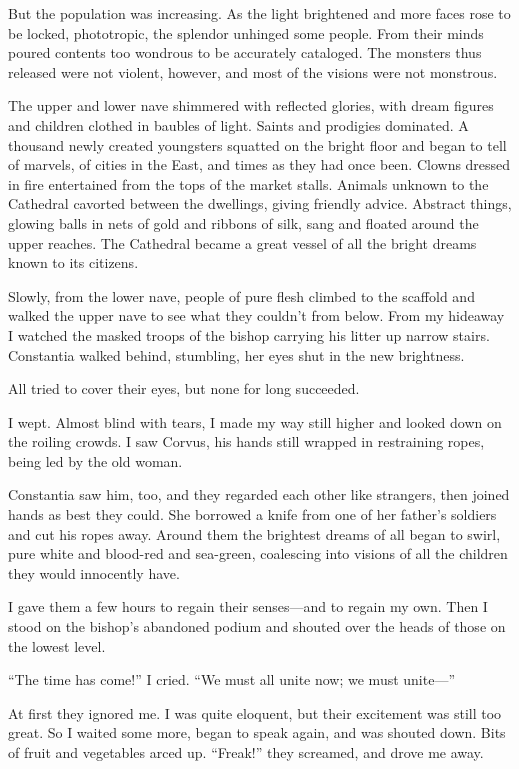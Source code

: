 But the population was increasing. As the light brightened and more faces rose to be locked, phototropic, the splendor unhinged some people. From their minds poured contents too wondrous to be accurately cataloged. The monsters thus released were not violent, however, and most of the visions were not monstrous.

The upper and lower nave shimmered with reflected glories, with dream figures and children clothed in baubles of light. Saints and prodigies dominated. A thousand newly created youngsters squatted on the bright floor and began to tell of marvels, of cities in the East, and times as they had once been. Clowns dressed in fire entertained from the tops of the market stalls. Animals unknown to the Cathedral cavorted between the dwellings, giving friendly advice. Abstract things, glowing balls in nets of gold and ribbons of silk, sang and floated around the upper reaches. The Cathedral became a great vessel of all the bright dreams known to its citizens.

Slowly, from the lower nave, people of pure flesh climbed to the scaffold and walked the upper nave to see what they couldn't from below. From my hideaway I watched the masked troops of the bishop carrying his litter up narrow stairs. Constantia walked behind, stumbling, her eyes shut in the new brightness.

All tried to cover their eyes, but none for long succeeded.

I wept. Almost blind with tears, I made my way still higher and looked down on the roiling crowds. I saw Corvus, his hands still wrapped in restraining ropes, being led by the old woman.

Constantia saw him, too, and they regarded each other like strangers, then joined hands as best they could. She borrowed a knife from one of her father's soldiers and cut his ropes away. Around them the brightest dreams of all began to swirl, pure white and blood-red and sea-green, coalescing into visions of all the children they would innocently have.

I gave them a few hours to regain their senses—and to regain my own. Then I stood on the bishop's abandoned podium and shouted over the heads of those on the lowest level.

``The time has come!'' I cried. ``We must all unite now; we must unite—''

At first they ignored me. I was quite eloquent, but their excitement was still too great. So I waited some more, began to speak again, and was shouted down. Bits of fruit and vegetables arced up. ``Freak!'' they screamed, and drove me away.

